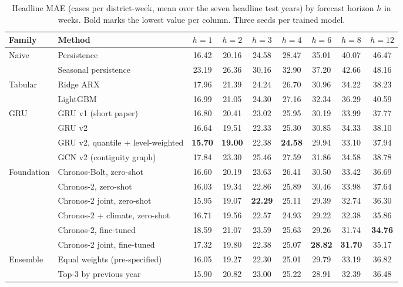 \begin{table}[t]
\centering
\caption{Headline MAE (cases per district-week, mean over the seven headline test years) by forecast horizon $h$ in weeks. Bold marks the lowest value per column. Three seeds per trained model.}
\label{tab:main}
\begin{tabular}{llccccccc}
\toprule
\textbf{Family} & \textbf{Method} & $h=1$ & $h=2$ & $h=3$ & $h=4$ & $h=6$ & $h=8$ & $h=12$ \\
\midrule
Naive & Persistence & 16.42 & 20.16 & 24.58 & 28.47 & 35.01 & 40.07 & 46.47 \\
 & Seasonal persistence & 23.19 & 26.36 & 30.16 & 32.90 & 37.20 & 42.66 & 48.16 \\
Tabular & Ridge ARX & 17.96 & 21.39 & 24.24 & 26.70 & 30.96 & 34.22 & 38.23 \\
 & LightGBM & 16.99 & 21.05 & 24.30 & 27.16 & 32.34 & 36.29 & 40.59 \\
GRU & GRU v1 (short paper) & 16.80 & 20.41 & 23.02 & 25.95 & 30.19 & 33.99 & 37.77 \\
 & GRU v2 & 16.64 & 19.51 & 22.33 & 25.30 & 30.85 & 34.33 & 38.10 \\
 & GRU v2, quantile + level-weighted & \textbf{15.70} & \textbf{19.00} & 22.38 & \textbf{24.58} & 29.94 & 33.10 & 37.94 \\
 & GCN v2 (contiguity graph) & 17.84 & 23.30 & 25.46 & 27.59 & 31.86 & 34.58 & 38.78 \\
Foundation & Chronos-Bolt, zero-shot & 16.60 & 20.19 & 23.63 & 26.41 & 30.50 & 33.42 & 36.69 \\
 & Chronos-2, zero-shot & 16.03 & 19.34 & 22.86 & 25.89 & 30.46 & 33.98 & 37.64 \\
 & Chronos-2 joint, zero-shot & 15.95 & 19.07 & \textbf{22.29} & 25.11 & 29.39 & 32.74 & 36.30 \\
 & Chronos-2 + climate, zero-shot & 16.71 & 19.56 & 22.57 & 24.93 & 29.22 & 32.38 & 35.86 \\
 & Chronos-2, fine-tuned & 18.59 & 21.07 & 23.59 & 25.63 & 29.26 & 31.74 & \textbf{34.76} \\
 & Chronos-2 joint, fine-tuned & 17.32 & 19.80 & 22.38 & 25.07 & \textbf{28.82} & \textbf{31.70} & 35.17 \\
Ensemble & Equal weights (pre-specified) & 16.05 & 19.27 & 22.30 & 25.01 & 29.79 & 33.19 & 36.82 \\
 & Top-3 by previous year & 15.90 & 20.82 & 23.00 & 25.22 & 28.91 & 32.39 & 36.48 \\
\bottomrule
\end{tabular}
\end{table}

